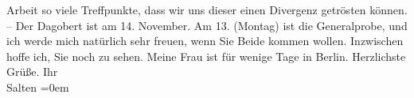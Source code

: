 \begin{ledgroupsized}[t]{13cm}
               Arbeit so viele Treffpunkte, dass wir uns dieser einen Divergenz getrösten können. –
               Der Dagobert ist am 14. November.
               Am 13. (Montag) ist die Generalprobe, und ich werde mich natürlich sehr
               freuen, wenn Sie Beide kommen
               wollen. Inzwischen hoffe ich, Sie noch zu sehen. Meine Frau ist für wenige Tage in Berlin. \pend
           \pstart
           Herzlichste Grüße. Ihr {\\[\baselineskip]}\spacefill\mbox{Salten}\pend
           \leftskip=0em{}
         
         \endnumbering{}\end{ledgroupsized}\begin{anhang}\end{anhang}\newcommand{\dateiname}{L03554}\newcommand{\titel}{Felix Salten an Arthur Schnitzler, 22. 10. 1911}\newcommand{\editorInnen}{Martin Anton Müller und Laura Untner}
      
